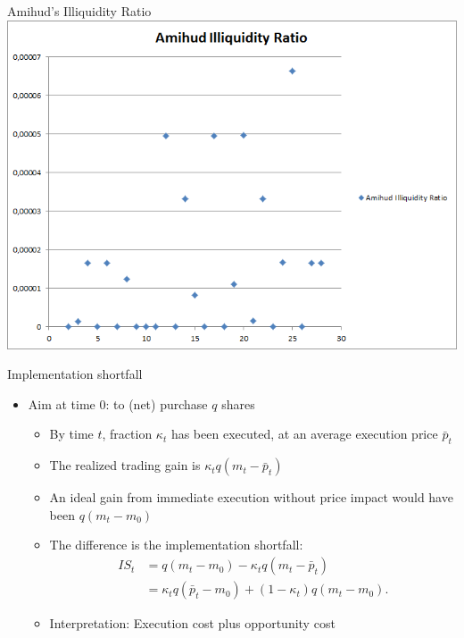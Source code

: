 \documentclass[english,10pt]{beamer}
\begin{document}
\begin{frame}{Amihud's Illiquidity Ratio}
\center
\includegraphics[scale=0.39]{pics/L2_Amihud}
\end{frame}


\begin{frame}{Implementation shortfall}
	\begin{itemize}
		\item Aim at time 0: to (net) purchase $q$ shares
		\begin{itemize}
			\item By time $t$, fraction $\kappa_t$ has been executed, at an average execution price $\bar{p}_t$
			\item The realized trading gain is $\kappa_t q(m_t-\bar{p}_t)$
			\item An ideal gain from immediate execution without price impact would have been $q(m_t - m_0)$
			\item The difference is the \alert{implementation shortfall}:
			\begin{align*}
			IS_t 
			& = q(m_t-m_0) - \kappa_t q (m_t - \bar{p}_t) \\
			& = \kappa_t q(\bar{p}_t - m_0) + (1-\kappa_t) q (m_t - m_0).
			\end{align*}
			\item Interpretation: Execution cost plus opportunity cost
		\end{itemize}
	\end{itemize}
\end{frame}
\end{document}
